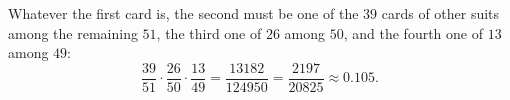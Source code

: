 Whatever the first card is, the second must be one of the $39$ cards of other suits among the remaining $51$, the third one of $26$ among $50$, and the fourth one of $13$ among $49$:
\[\dfrac{39}{51}\cdot\dfrac{26}{50}\cdot\dfrac{13}{49}=\dfrac{13182}{124950}=\boxed{\dfrac{2197}{20825}}\approx0.105.\]
